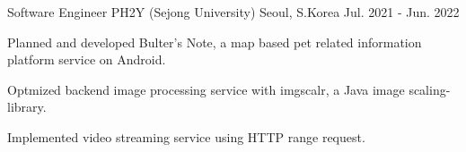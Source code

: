 \begin{cventries}
  \cventry
    {Software Engineer} %
    {PH2Y (Sejong University)} %
    {Seoul, S.Korea} %
    {Jul. 2021 - Jun. 2022} %
    {
      \begin{cvitems} %
        \item {Planned and developed Bulter's Note, a map based pet related information platform service on Android.}
        \item {Optmized backend image processing service with imgscalr, a Java image scaling-library.}
        \item {Implemented video streaming service using HTTP range request.}
      \end{cvitems}
    }

\end{cventries}
